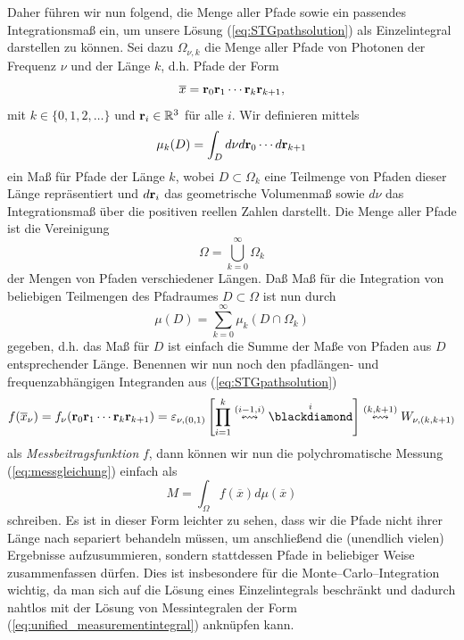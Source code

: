 	Daher führen wir nun \citet[][8.2]{Veach:1997p9136} folgend, die Menge aller Pfade sowie ein passendes Integrationsmaß ein, um unsere Lösung (\ref{eq:STGpathsolution}) als Einzelintegral darstellen zu können. Sei dazu $\Omega_{\nu,k}$ die Menge aller Pfade von Photonen der Frequenz $\nu$ und der Länge $k$, d.h. Pfade der Form
	$${\overline x}=\mathbf{r}_0\mathbf{r}_1\cdots\mathbf{r}_k\mathbf{r}_{k+1},$$
	mit $k\in\{0,1,2,\dots\}$ und $\mathbf{r}_i \in \mathbb{R}^3$ für alle $i$. Wir definieren mittels
	$$\mu_k(D)=\int_D d\nu d\mathbf{r}_0\cdots d\mathbf{r}_{k+1}$$
	ein Maß für Pfade der Länge $k$, wobei $D\subset\Omega_k$ eine Teilmenge von Pfaden dieser Länge repräsentiert und $d\mathbf{r}_i$ das geometrische Volumenmaß sowie $d\nu$ das Integrationsmaß über die positiven reellen Zahlen darstellt. Die Menge aller Pfade ist die Vereinigung
	$$\Omega=\bigcup_{k=0}^\infty \Omega_k$$
	der Mengen von Pfaden verschiedener Längen. Daß Maß für die Integration von beliebigen Teilmengen des Pfadraumes $D\subset\Omega$ ist nun durch
	$$\mu(D)=\sum_{k=0}^\infty \mu_k(D\cap\Omega_k)$$
	gegeben, d.h. das Maß für $D$ ist einfach die Summe der Maße von Pfaden aus $D$ entsprechender Länge. Benennen wir nun noch den pfadlängen- und frequenzabhängigen Integranden aus (\ref{eq:STGpathsolution})
	\begin{equation}
		f({\overline x}_\nu)=f_\nu(\location{r}_0\location{r}_1\cdots\location{r}_k\location{r}_{k+1})=\varepsilon_{\nu,(0,1)}\left[\prod_{i=1}^k\propagate{i-1}{i}\scatter{i}\right]\propagate{k}{k+1} W_{\nu,(k,k+1)}
		\label{eq:mcf}
	\end{equation}
	als {\em Messbeitragsfunktion} $f$, dann können wir nun die polychromatische Messung (\ref{eq:messgleichung}) einfach als
	\begin{equation}
		M=\int_\Omega f({\overline x})d\mu({\overline x})
		\label{eq:unified_measurementintegral}
	\end{equation}
	schreiben. Es ist in dieser Form leichter zu sehen, dass wir die Pfade nicht ihrer Länge nach separiert behandeln müssen, um anschließend die (unendlich vielen) Ergebnisse aufzusummieren, sondern stattdessen Pfade in beliebiger Weise zusammenfassen dürfen. Dies ist insbesondere für die Monte--Carlo--Integration wichtig, da man sich auf die Lösung eines Einzelintegrals beschränkt und dadurch nahtlos mit der Lösung von Messintegralen der Form (\ref{eq:unified_measurementintegral}) anknüpfen kann.
